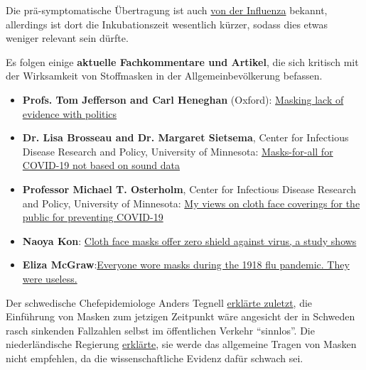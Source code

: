 Die prä-symptomatische Übertragung ist auch
\href{https://virologydownunder.com/influenza-virus-transmission-with-or-without-symptoms-youre-dropping-flu-virus/}{von
der Influenza} bekannt, allerdings ist dort die Inkubationszeit
wesentlich kürzer, sodass dies etwas weniger relevant sein dürfte.

Es folgen einige \textbf{aktuelle Fachkommentare und Artikel}, die sich
kritisch mit der Wirksamkeit von Stoffmasken in der Allgemeinbevölkerung
befassen.

\begin{itemize}
\tightlist
\item
  \textbf{Profs. Tom Jefferson and Carl Heneghan} (Oxford):
  \href{https://www.cebm.net/covid-19/masking-lack-of-evidence-with-politics/}{Masking
  lack of evidence with politics}
\item
  \textbf{Dr. Lisa Brosseau and Dr. Margaret Sietsema}, Center for
  Infectious Disease Research and Policy, University of Minnesota:
  \href{https://www.cidrap.umn.edu/news-perspective/2020/04/commentary-masks-all-covid-19-not-based-sound-data}{Masks-for-all
  for COVID-19 not based on sound data}
\item
  \textbf{Professor Michael T. Osterholm}, Center for Infectious Disease
  Research and Policy, University of Minnesota:
  \href{https://www.cidrap.umn.edu/news-perspective/2020/07/commentary-my-views-cloth-face-coverings-public-preventing-covid-19}{My
  views on cloth face coverings for the public for preventing COVID-19}
\item
  \textbf{Naoya Kon}:
  \href{http://www.asahi.com/ajw/articles/13523664}{Cloth face masks
  offer zero shield against virus, a study shows}
\item
  \textbf{Eliza
  McGraw}:\href{https://www.seattletimes.com/nation-world/everyone-wore-masks-during-the-1918-flu-pandemic-they-were-useless/}{Everyone
  wore masks during the 1918 flu pandemic. They were useless.}
\end{itemize}

Der schwedische Chefepidemiologe Anders Tegnell
\href{https://www.bloomberg.com/news/articles/2020-07-28/sweden-unveils-promising-covid-19-data-as-new-cases-plunge}{erklärte
zuletzt}, die Einführung von Masken zum jetzigen Zeitpunkt wäre
angesicht der in Schweden rasch sinkenden Fallzahlen selbst im
öffentlichen Verkehr ``sinnlos''. Die niederländische Regierung
\href{https://www.reuters.com/article/us-health-coronavirus-netherlands-idUSKCN24U2UJ}{erklärte},
sie werde das allgemeine Tragen von Masken nicht empfehlen, da die
wissenschaftliche Evidenz dafür schwach sei.

